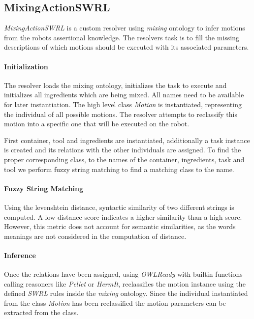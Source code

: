 \subsection{MixingActionSWRL}
\textit{MixingActionSWRL} is a custom resolver using \textit{mixing} ontology to infer motions from the robots assertional knowledge.
The resolvers task is to fill the missing descriptions of which motions should be executed with its associated parameters.

\paragraph{Initialization}
The resolver loads the mixing ontology, initializes the task to execute and initializes all ingredients which are being mixed. 
All names need to be available for later instantiation.
The high level class \textit{Motion} is instantiated, representing the individual of all possible motions. 
The resolver attempts to reclassify this motion into a specific one that will be executed on the robot.

First container, tool and ingredients are instantiated, additionally a task instance is created and its relations with 
the other individuals are assigned. To find the proper corresponding class, to the names of the container, ingredients, task and tool
we perform fuzzy string matching to find a matching class to the name. 

\paragraph{Fuzzy String Matching}
Using the levenshtein distance, syntactic similarity of two different strings is computed. A low distance score
indicates a higher similarity than a high score. However, this metric does not account for semantic similarities, 
as the words meanings are not considered in the computation of distance.

\paragraph{Inference}
Once the relations have been assigned, using \textit{OWLReady} with builtin functions calling reasoners like \textit{Pellet} or \textit{HermIt},
reclassifies the motion instance using the defined \textit{SWRL} rules inside the \textit{mixing} ontology.
Since the individual instantiated from the class \textit{Motion} has been reclassified the motion parameters can be extracted from the class.

